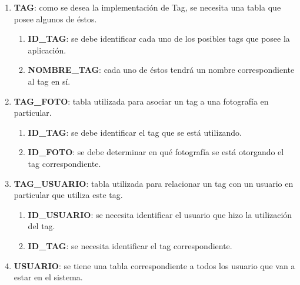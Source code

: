\documentclass{memoria}
\begin{document}
\begin{enumerate}
\item \textbf{TAG}: como se desea la implementación de Tag, se necesita una tabla que posee algunos de éstos.

	\begin{enumerate}
	 \item \textbf{ID\_TAG}: se debe identificar cada uno de los posibles tags que posee la aplicación.
	 \item \textbf{NOMBRE\_TAG}: cada uno de éstos tendrá un nombre correspondiente al tag en sí.
	 \end{enumerate} 

\item \textbf{TAG\_FOTO}: tabla utilizada para asociar un tag a una fotografía en particular.

	\begin{enumerate}
	\item \textbf{ID\_TAG}: se debe identificar el tag que se está utilizando.
	\item \textbf{ID\_FOTO}: se debe determinar en qué fotografía se está otorgando el tag correspondiente.
	\end{enumerate}
	
\item \textbf{TAG\_USUARIO}: tabla utilizada para relacionar un tag con un usuario en particular que utiliza este tag.

	\begin{enumerate}
	\item \textbf{ID\_USUARIO}: se necesita identificar el usuario que hizo la utilización del tag.
	\item \textbf{ID\_TAG}: se necesita identificar el tag correspondiente.
	\end{enumerate}
	
\item \textbf{USUARIO}: se tiene una tabla correspondiente a todos los usuario que van a estar en el sistema.


\end{enumerate}
\end{document}
